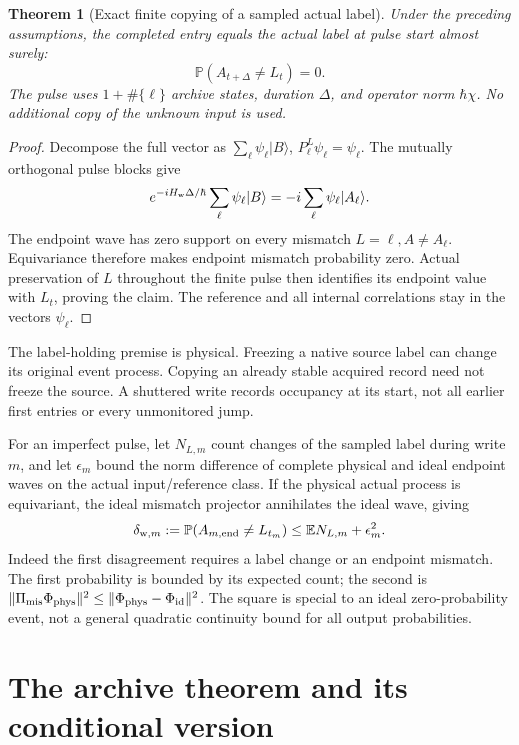\documentclass[11pt,oneside,openany]{book}
\newtheorem{theorem}{Theorem}[chapter]
\theoremstyle{definition}
\theoremstyle{remark}\newtheorem{remark}[theorem]{Remark}
\begin{document}
\begin{theorem}[Exact finite copying of a sampled actual label]
\label{cfg:heldcopy}
Under the preceding assumptions, the completed entry equals the actual
label at pulse start almost surely:
\[
 \mathbb P(A_{t+\Delta}\ne L_t)=0.
\]
The pulse uses $1+\#\{\ell\}$ archive states, duration $\Delta$, and
operator norm $\hbar\chi$. No additional copy of the unknown input is used.
\end{theorem}
\begin{proof}
Decompose the full vector as $\sum_\ell\psi_\ell|B\rangle$,
$P_\ell^L\psi_\ell=\psi_\ell$. The mutually orthogonal pulse blocks give
\[
 e^{-iH_{\rm w}\Delta/\hbar}\sum_\ell\psi_\ell|B\rangle
       =-i\sum_\ell\psi_\ell|A_\ell\rangle.
\]
The endpoint wave has zero support on every mismatch
$L=\ell,A\ne A_\ell$. Equivariance therefore makes endpoint mismatch
probability zero. Actual preservation of $L$ throughout the finite pulse
then identifies its endpoint value with $L_t$, proving the claim. The
reference and all internal correlations stay in the vectors $\psi_\ell$.
\end{proof}

The label-holding premise is physical. Freezing a native source label can
change its original event process. Copying an already stable acquired record
need not freeze the source. A shuttered write records occupancy at its
start, not all earlier first entries or every unmonitored jump.

For an imperfect pulse, let $N_{L,m}$ count changes of the sampled label
during write $m$, and let $\epsilon_m$ bound the norm difference of complete
physical and ideal endpoint waves on the actual input/reference class.
If the physical actual process is equivariant, the ideal mismatch projector
annihilates the ideal wave, giving
\begin{equation}
 \delta_{{\rm w},m}
 :=\mathbb P(A_{m,\rm end}\ne L_{t_m})
 \le \mathbb E N_{L,m}+\epsilon_m^2.
 \label{cfg:writeerror}
\end{equation}
Indeed the first disagreement requires a label change or an endpoint
mismatch. The first probability is bounded by its expected count; the
second is $\|\Pi_{\rm mis}\Phi_{\rm phys}\|^2
\le\|\Phi_{\rm phys}-\Phi_{\rm id}\|^2$.
The square is special to an ideal zero-probability event, not a general
quadratic continuity bound for all output probabilities.

\section{The archive theorem and its conditional version}
\end{document}
